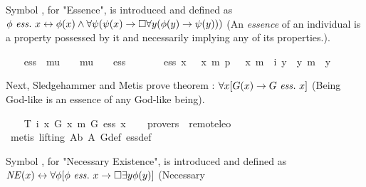 \begin{isabellebody}
\begin{isamarkuptext}%
Symbol , for "Essence", is introduced and defined as 
$\phi \ \mathit{ess.} \ x \leftrightarrow \phi(x) \wedge \forall \psi (\psi(x) \rightarrow \Box \forall y (\phi(y) 
\rightarrow \psi(y)))$ (An \emph{essence} of an individual is a property possessed by it 
and necessarily implying any of its properties.).%
\end{isamarkuptext}%
\isamarkuptrue%
\ \ \isamarkupfalse%
\ ess\ {\isacharcolon}{\isacharcolon}\ {\isachardoublequoteopen}{\isacharparenleft}mu\ {\isasymRightarrow}\ {\isasymsigma}{\isacharparenright}\ {\isasymRightarrow}\ mu\ {\isasymRightarrow}\ {\isasymsigma}{\isachardoublequoteclose}\ {\isacharparenleft}\ {\isachardoublequoteopen}ess{\isachardoublequoteclose}\ {}{}{\isacharparenright}\ \isanewline
\ \ \ \ {\isachardoublequoteopen}{\isasymPhi}\ ess\ x\ {\isacharequal}\ {\isasymPhi}\ x\ m{\isasymand}\ {\isasymforall}p\ {\isacharparenleft}{\isasymlambda}{\isasympsi}{\isachardot}\ {\isasympsi}\ x\ m{\isasymRightarrow}\ {\isasymbox}\ {\isacharparenleft}{\isasymforall}i\ {\isacharparenleft}{\isasymlambda}y{\isachardot}\ {\isasymPhi}\ y\ m{\isasymRightarrow}\ {\isasympsi}\ y{\isacharparenright}{\isacharparenright}{\isacharparenright}{\isachardoublequoteclose}%
\begin{isamarkuptext}%
Next, Sledgehammer and Metis prove theorem : $\forall x [G(x) \rightarrow G \ \mathit{ess.} \ x]$ 
(Being God-like is an essence of any God-like being).%
\end{isamarkuptext}%
\isamarkuptrue%
\ \ \isamarkupfalse%
\ T{}{\isacharcolon}\ {\isachardoublequoteopen}{\isacharbrackleft}{\isasymforall}i\ {\isacharparenleft}{\isasymlambda}x{\isachardot}\ G\ x\ m{\isasymRightarrow}\ G\ ess\ x{\isacharparenright}{\isacharbrackright}{\isachardoublequoteclose}\isanewline
\ \ \isamarkupfalse%
\ {\isacharbrackleft}provers\ {\isacharequal}\ remote{\isacharunderscore}leo{}{\isacharbrackright}\isanewline
%
\isadelimproof
\ \ %
\endisadelimproof
%
\isatagproof
{}\isamarkupfalse%
\ {\isacharparenleft}metis\ {\isacharparenleft}lifting{\isacharparenright}\ A{}b\ A{}\ G{\isacharunderscore}def\ ess{\isacharunderscore}def{\isacharparenright}%
\endisatagproof
{\isafoldproof}%
%
\isadelimproof
%
\endisadelimproof
%
\begin{isamarkuptext}%
Symbol , for "Necessary Existence", is introduced and
defined as $\mathit{NE}(x) \leftrightarrow \forall \phi [\phi \ \mathit{ess.} \ x \rightarrow \Box \exists y \phi(y)]$ (Necessary 

\end{isamarkuptext}
\end{isabellebody}
